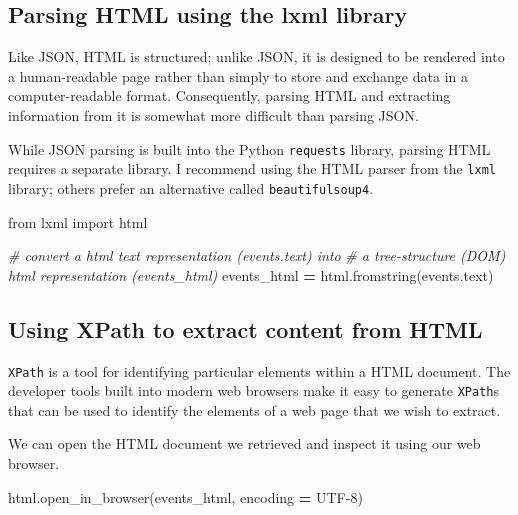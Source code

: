 \documentclass[
]{book}
\newenvironment{Shaded}{\begin{snugshade}}{\end{snugshade}}
\newcommand{\CommentTok}[1]{\textcolor[rgb]{0.56,0.35,0.01}{\textit{#1}}}
\newcommand{\ImportTok}[1]{#1}
\newcommand{\NormalTok}[1]{#1}
\newcommand{\OperatorTok}[1]{\textcolor[rgb]{0.81,0.36,0.00}{\textbf{#1}}}
\newcommand{\StringTok}[1]{\textcolor[rgb]{0.31,0.60,0.02}{#1}}
\begin{document}
\hypertarget{parsing-html-using-the-lxml-library}{%
\subsection{Parsing HTML using the lxml library}\label{parsing-html-using-the-lxml-library}}

Like JSON, HTML is structured; unlike JSON, it is designed to be rendered into a human-readable page rather than simply to store and exchange data in a computer-readable format. Consequently, parsing HTML and extracting information from it is somewhat more difficult than parsing JSON.

While JSON parsing is built into the Python \texttt{requests} library, parsing HTML requires a separate library. I recommend using the HTML parser from the \texttt{lxml} library; others prefer an alternative called \texttt{beautifulsoup4}.

\begin{Shaded}
\begin{Highlighting}[]
\ImportTok{from}\NormalTok{ lxml }\ImportTok{import}\NormalTok{ html}

\CommentTok{\# convert a html text representation (\textasciigrave{}events.text\textasciigrave{}) into }
\CommentTok{\# a tree{-}structure (DOM) html representation (\textasciigrave{}events\_html\textasciigrave{})}
\NormalTok{events\_html }\OperatorTok{=}\NormalTok{ html.fromstring(events.text)}
\end{Highlighting}
\end{Shaded}

\hypertarget{using-xpath-to-extract-content-from-html}{%
\subsection{Using XPath to extract content from HTML}\label{using-xpath-to-extract-content-from-html}}

\texttt{XPath} is a tool for identifying particular elements within a HTML document. The developer tools built into modern web browsers make it easy to generate \texttt{XPath}s that can be used to identify the elements of a web page that we wish to extract.

We can open the HTML document we retrieved and inspect it using our web browser.

\begin{Shaded}
\begin{Highlighting}[]
\NormalTok{html.open\_in\_browser(events\_html, encoding }\OperatorTok{=} \StringTok{\textquotesingle{}UTF{-}8\textquotesingle{}}\NormalTok{)}
\end{Highlighting}
\end{Shaded}
\end{document}
